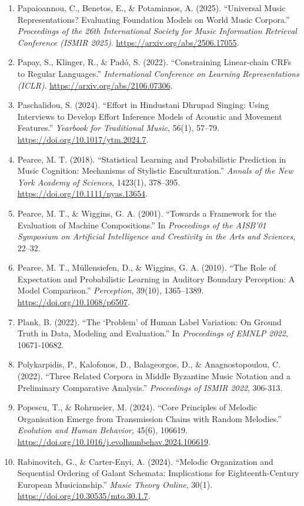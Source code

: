 \documentclass[11pt,a4paper]{article}
\begin{document}
\begin{enumerate}
\item
 Papaioannou, C., Benetos, E., \& Potamianos, A. (2025). ``Universal Music Representations? Evaluating Foundation Models on World Music Corpora.'' \emph{Proceedings of the 26th International Society for Music Information Retrieval Conference (ISMIR 2025)}. \url{https://arxiv.org/abs/2506.17055}.
\item
 Papay, S., Klinger, R., \& Padó, S. (2022). ``Constraining Linear-chain CRFs to Regular Languages.'' \emph{International Conference on Learning Representations (ICLR)}. \url{https://arxiv.org/abs/2106.07306}.
\item
 Paschalidou, S. (2024). ``Effort in Hindustani Dhrupad Singing: Using Interviews to Develop Effort Inference Models of Acoustic and Movement Features.'' \emph{Yearbook for Traditional Music}, 56(1), 57--79. \url{https://doi.org/10.1017/ytm.2024.7}.
\item
 Pearce, M. T. (2018). ``Statistical Learning and Probabilistic Prediction in Music Cognition: Mechanisms of Stylistic Enculturation.'' \emph{Annals of the New York Academy of Sciences}, 1423(1), 378--395. \url{https://doi.org/10.1111/nyas.13654}.
\item
 Pearce, M. T., \& Wiggins, G. A. (2001). ``Towards a Framework for the Evaluation of Machine Compositions.'' In \emph{Proceedings of the AISB'01 Symposium on Artificial Intelligence and Creativity in the Arts and Sciences}, 22--32.
\item
 Pearce, M. T., Müllensiefen, D., \& Wiggins, G. A. (2010). ``The Role of Expectation and Probabilistic Learning in Auditory Boundary Perception: A Model Comparison.'' \emph{Perception}, 39(10), 1365--1389. \url{https://doi.org/10.1068/p6507}.
\item
 Plank, B. (2022). ``The `Problem' of Human Label Variation: On Ground Truth in Data, Modeling and Evaluation.'' In \emph{Proceedings of EMNLP 2022}, 10671-10682.
\item
 Polykarpidis, P., Kalofonos, D., Balageorgos, D., \& Anagnostopoulou, C. (2022). ``Three Related Corpora in Middle Byzantine Music Notation and a Preliminary Comparative Analysis.'' \emph{Proceedings of ISMIR 2022}, 306-313.
\item
 Popescu, T., \& Rohrmeier, M. (2024). ``Core Principles of Melodic Organisation Emerge from Transmission Chains with Random Melodies.'' \emph{Evolution and Human Behavior}, 45(6), 106619. \url{https://doi.org/10.1016/j.evolhumbehav.2024.106619}.
\item
 Rabinovitch, G., \& Carter-Enyi, A. (2024). ``Melodic Organization and Sequential Ordering of Galant Schemata: Implications for Eighteenth-Century European Musicianship.'' \emph{Music Theory Online}, 30(1). \url{https://doi.org/10.30535/mto.30.1.7}.

\end{enumerate}
\end{document}
